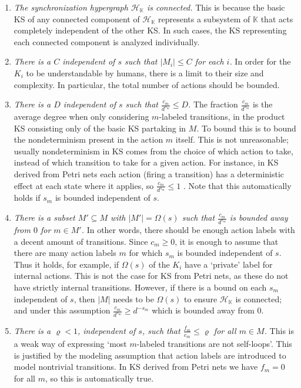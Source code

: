 \documentclass[runngingheads]{llncs}
\begin{document}
\begin{enumerate}
\item \emph{The synchronization hypergraph $\mathcal{H}_{\mathbb{K}}$ is connected.} This is because the basic KS of any connected component of $\mathcal{H}_{\mathbb{K}}$ represents a subsystem of $\mathbb{K}$ that acts completely independent of the other KS. In such cases, the KS representing each connected component is analyzed individually.
    \item \emph{There is a $C$ independent of $s$ such that $|M_i| \leq C$ for each $i$.} In order for the $K_i$ to be understandable by humans, there is a limit to their size and complexity. In particular, the total number of actions should be bounded.
    \item \emph{There is a $D$ independent of $s$ such that  $\tfrac{c_m}{d^{s_m}} \leq D$.} The fraction $\tfrac{c_m}{d^{s_m}}$ is the average degree when only considering $m$-labeled transitions, in the product KS consisting only of the basic KS partaking in $M$. To bound this is to bound the nondeterminism present in the action $m$ itself. This is not unreasonable; usually nondeterminism in KS comes from the choice of which action to take, instead of which transition to take for a given action. For instance, in KS derived from Petri nets each action (firing a transition) has a deterministic effect at each state where it applies, so $\tfrac{c_m}{d^{s_m}} \leq 1$ \cite{ma2016basis}. Note that this automatically holds if $s_m$ is bounded independent of $s$.
    \item \emph{There is a subset $M' \subseteq M$ with $|M'| = \Omega(s)$ such that $\tfrac{c_m}{d^{s_m}}$ is bounded away from $0$ for $m \in M'$.} In other words, there should be enough action labels with a decent amount of transitions. Since $c_m \geq 0$, it is enough to assume that there are many action labels $m$ for which $s_m$ is bounded independent of $s$. Thus it holds, for example, if $\Omega(s)$ of the $K_i$ have a `private' label for internal actions. This is not the case for KS from Petri nets, as these do not have strictly internal transitions. However, if there is a bound on each $s_m$ independent of $s$, then $|M|$ needs to be $\Omega(s)$ to ensure $\mathcal{H}_{\mathbb{K}}$ is connected; and under this assumption $\tfrac{c_m}{d^{s_m}} \geq d^{-s_m}$ which is bounded away from $0$.
    \item \emph{There is a $\varrho < 1$, independent of $s$, such that $\frac{f_m}{c_m} \leq \varrho$ for all $m \in M$.} This is a weak way of expressing `most $m$-labeled transitions are not self-loops'. This is justified by the modeling assumption that action labels are introduced to model nontrivial transitions. In KS derived from Petri nets we have $f_m = 0$ for all $m$, so this is automatically true.
\end{enumerate}
\end{document}
